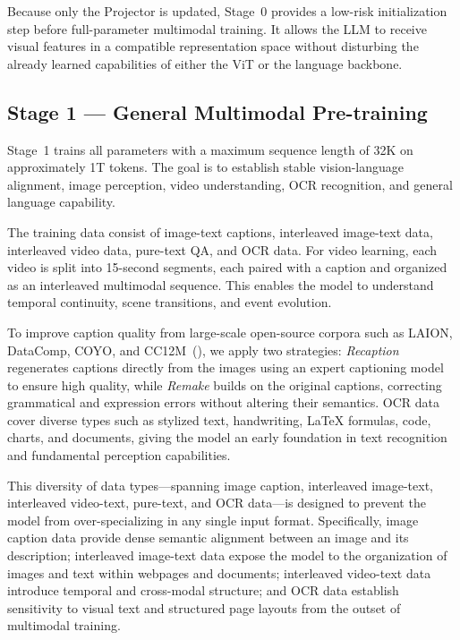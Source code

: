 \documentclass{article} %
\begin{document}
Because only the Projector is updated, Stage~0 provides a low-risk initialization step before full-parameter multimodal training. It allows the LLM to receive visual features in a compatible representation space without disturbing the already learned capabilities of either the ViT or the language backbone.

\subsection{Stage 1 --- General Multimodal Pre-training}

Stage~1 trains all parameters with a maximum sequence length of 32K on approximately 1T tokens. The goal is to establish stable vision-language alignment, image perception, video understanding, OCR recognition, and general language capability.


The training data consist of image-text captions, interleaved image-text data, interleaved video data, pure-text QA, and OCR data. For video learning, each video is split into 15-second segments, each paired with a caption and organized as an interleaved multimodal sequence. This enables the model to understand temporal continuity, scene transitions, and event evolution.


To improve caption quality from large-scale open-source corpora such as LAION, DataComp, COYO, and CC12M~(\cite{laion,datacomp,coyo,cc12m}), we apply two strategies: \emph{Recaption} regenerates captions directly from the images using an expert captioning model to ensure high quality, while \emph{Remake} builds on the original captions, correcting grammatical and expression errors without altering their semantics. OCR data cover diverse types such as stylized text, handwriting, LaTeX formulas, code, charts, and documents, giving the model an early foundation in text recognition and fundamental perception capabilities.


This diversity of data types—spanning image caption, interleaved image-text, interleaved video-text, pure-text, and OCR data—is designed to prevent the model from over-specializing in any single input format. Specifically, image caption data provide dense semantic alignment between an image and its description; interleaved image-text data expose the model to the organization of images and text within webpages and documents; interleaved video-text data introduce temporal and cross-modal structure; and OCR data establish sensitivity to visual text and structured page layouts from the outset of multimodal training.
\end{document}
